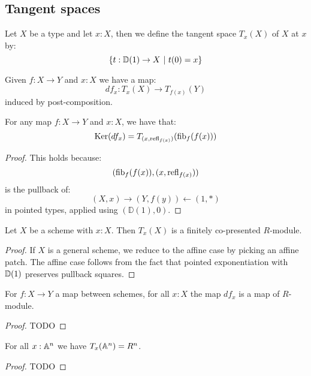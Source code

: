 \subsection{Tangent spaces}

\begin{definition}
Let $X$ be a type and let $x:X$, then we define the tangent space $T_x(X)$ of $X$ at $x$ by:
\[\{t:\D(1)\to X\ |\ t(0)=x\}\]
\end{definition}

\begin{definition}
Given $f:X\to Y$ and $x:X$ we have a map:
\[df_x : T_x(X)\to T_{f(x)}(Y)\]
induced by post-composition.
\end{definition}

\begin{lemma}
\label{kernel-is-tangent-of-fibers}
For any map $f:X\to Y$ and $x:X$, we have that:
\[
\mathrm{Ker}(df_x) = T_{(x,\mathrm{refl}_{f(x)})}(\mathrm{fib}_f(f(x)))
\]
\end{lemma}

\begin{proof}
This holds because:
\[
(\mathrm{fib}_f(f(x)),(x,\mathrm{refl}_{f(x)}))
\]
is the pullback of:
\[
(X,x) \to (Y,f(y)) \leftarrow (1,*)
\]
in pointed types, applied using $(\mathbb{D}(1),0)$.
\end{proof}

\begin{lemma}
Let $X$ be a scheme with $x : X$. Then $T_x(X)$ is a finitely
co-presented $R$-module.
\end{lemma}

\begin{proof}
If $X$ is a general scheme, we reduce to the affine case by picking an affine patch.
The affine case follows from the fact that pointed exponentiation with $\mathbb{D}(1)$
preserves pullback squares.
\end{proof}

\begin{lemma}
For $f:X\to Y$ a map between schemes, for all $x:X$ the map $df_x$ is a map of $R$-module.
\end{lemma}

\begin{proof}
TODO
\end{proof}

\begin{lemma}\label{An-dimension-n}
For all $x:\mathbb{A}^n$ we have $T_x(\mathbb{A}^n) = R^n$.
\end{lemma}

\begin{proof}
TODO
\end{proof}



